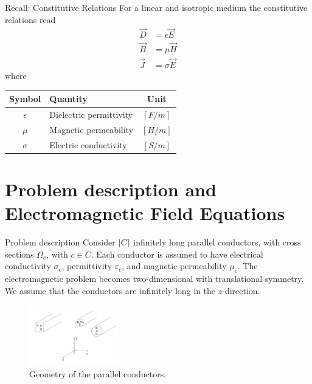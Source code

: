 \documentclass[aspectratio=54,xcolor=dvipsnames]{beamer}
\begin{document}
\begin{frame}{Recall: Constitutive Relations}
    For a linear and isotropic medium the constitutive relations read
    \begin{align*}
        \vec{D} &= \epsilon \vec{E} \\
        \vec{B} &= \mu \vec{H} \\
        \vec{J} &= \sigma \vec{E}
    \end{align*}
    \vspace{0.5em}
    where
    \begin{center}
    \begin{tabular}{|c|l|c|}
        \hline
        Symbol & Quantity & Unit \\
        \hline
        $\epsilon$ & Dielectric permittivity & $[F/m]$ \\
        $\mu$ & Magnetic permeability & $[H/m]$ \\
        $\sigma$ & Electric conductivity & $[S/m]$ \\
        \hline
    \end{tabular}
    \end{center}
\end{frame}

\section{Problem description and Electromagnetic Field Equations}
\begin{frame}{Problem description}
    Consider $\abs{C}$ infinitely long parallel conductors, with cross sections $\Omega_c$, with $c \in C$. Each conductor is assumed to have electrical conductivity $\sigma_c$, permittivity $\varepsilon_c$, and magnetic permeability $\mu_c$. The electromagnetic problem becomes two-dimensional with translational symmetry. We assume that the conductors are infinitely long in the $z$-direction.
        \begin{figure}[h]
            \centering
            \includegraphics[width=0.35\textwidth]{Images/Conductors_figure.png}
            \caption{Geometry of the parallel conductors.}
            \label{fig:conductors}
        \end{figure}
\end{frame}
\end{document}

